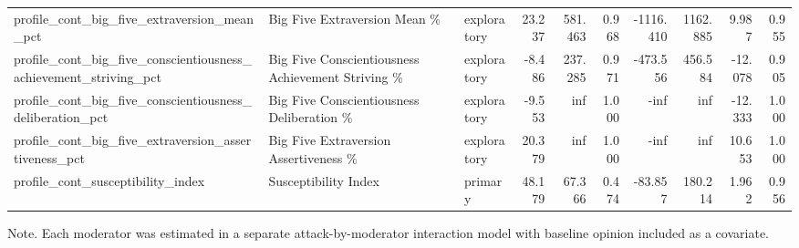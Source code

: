 \begin{table}[htbp]
\begin{threeparttable}
\begin{tabular}{lllrrrrrrr}
profile\_cont\_big\_five\_extraversion\_mean\_pct & Big Five Extraversion Mean \% & exploratory & 23.237 & 581.463 & 0.968 & -1116.410 & 1162.885 & 9.987 & 0.955 \\
profile\_cont\_big\_five\_conscientiousness\_achievement\_striving\_pct & Big Five Conscientiousness Achievement Striving \% & exploratory & -8.486 & 237.285 & 0.971 & -473.556 & 456.584 & -12.078 & 0.905 \\
profile\_cont\_big\_five\_conscientiousness\_deliberation\_pct & Big Five Conscientiousness Deliberation \% & exploratory & -9.553 & inf & 1.000 & -inf & inf & -12.333 & 1.000 \\
profile\_cont\_big\_five\_extraversion\_assertiveness\_pct & Big Five Extraversion Assertiveness \% & exploratory & 20.379 & inf & 1.000 & -inf & inf & 10.653 & 1.000 \\
profile\_cont\_susceptibility\_index & Susceptibility Index & primary & 48.179 & 67.366 & 0.474 & -83.857 & 180.214 & 1.962 & 0.956 \\
\bottomrule
\end{tabular}

\begin{tablenotes}[flushleft]\footnotesize\item Note. Each moderator was estimated in a separate attack-by-moderator interaction model with baseline opinion included as a covariate.\end{tablenotes}
\end{threeparttable}
\end{table}